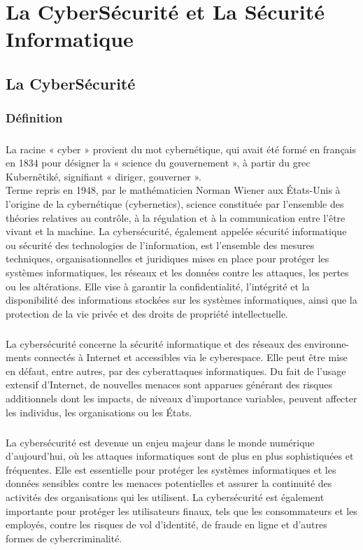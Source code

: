 \chapter{La CyberSécurité et La Sécurité Informatique}
\section{La CyberSécurité}
\subsection{Définition}
\paragraph{ }
La racine « cyber » provient du mot cybernétique, qui avait été formé en français
en 1834 pour désigner la « science du gouvernement », à partir du grec Kubernêtiké, signifiant « diriger, gouverner ».\\
Terme repris en 1948, par le mathématicien
Norman Wiener aux États-Unis à l’origine de la cybernétique (cybernetics), science
constituée par l’ensemble des théories relatives au contrôle, à la régulation et à la
communication entre l’être vivant et la machine.
La cybersécurité, également appelée sécurité informatique ou sécurité des technologies de l'information, est l'ensemble des mesures techniques, organisationnelles et juridiques mises en place pour protéger les systèmes informatiques, les réseaux et les données contre les attaques, les pertes ou les altérations. Elle vise à garantir la confidentialité, l'intégrité et la disponibilité des informations stockées sur les systèmes informatiques, ainsi que la protection de la vie privée et des droits de propriété intellectuelle.
\paragraph{ }
La cybersécurité concerne la sécurité informatique et des réseaux des environne-
ments connectés à Internet et accessibles via le cyberespace. Elle peut être mise en
défaut, entre autres, par des cyberattaques informatiques. Du fait de l’usage extensif
d’Internet, de nouvelles menaces sont apparues générant des risques additionnels
dont les impacts, de niveaux d’importance variables, peuvent affecter les individus,
les organisations ou les États. 
\paragraph{ }
La cybersécurité est devenue un enjeu majeur dans le monde numérique d'aujourd'hui, où les attaques informatiques sont de plus en plus sophistiquées et fréquentes. Elle est essentielle pour protéger les systèmes informatiques et les données sensibles contre les menaces potentielles et assurer la continuité des activités des organisations qui les utilisent. La cybersécurité est également importante pour protéger les utilisateurs finaux, tels que les consommateurs et les employés, contre les risques de vol d'identité, de fraude en ligne et d'autres formes de cybercriminalité.\\
